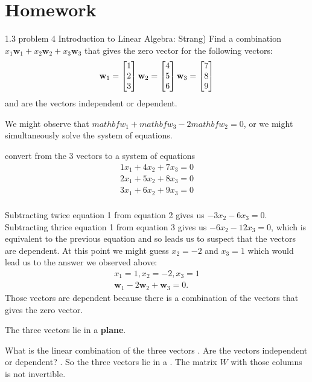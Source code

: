 \documentclass{ximera}
\begin{document}
\section*{Homework}
\begin{question}
1.3 problem 4 Introduction to Linear Algebra: Strang) Find a combination $x_1\mathbf{w}_1 + x_2\mathbf{w}_2 + x_3\mathbf{w}_3$ that gives the zero vector for the following vectors:
\begin{align*}
\mathbf{w}_1 = \begin{bmatrix}1\\2\\3\end{bmatrix} \mathbf{w}_2 = \begin{bmatrix}4\\5\\6\end{bmatrix} \mathbf{w}_3 = \begin{bmatrix}7\\8\\9\end{bmatrix}
\end{align*}
and are the vectors independent or dependent.
\begin{solution}
\begin{hint}
We might observe that $mathbf{w}_1 + mathbf{w}_3 -2mathbf{w}_2 = 0$, or we might simultaneously solve the system of equations.
\end{hint}
\begin{hint}
convert from the 3 vectors to a system of equations
\begin{align*}
1x_1+4x_2+7x_3=0\\
2x_1+5x_2+8x_3=0\\
3x_1+6x_2+9x_3=0\\
\end{align*}
\end{hint}
\begin{hint}
Subtracting twice equation 1 from equation 2 gives us $-3x_2 - 6x_3 = 0$. Subtracting thrice equation 1 from equation 3 gives us $-6x_2 - 12x_3 = 0$, which is equivalent to the previous equation and so leads us to suspect that the vectors are dependent. At this point we might guess $x_2 = -2$ and $x_3 = 1$ which would lead us to the answer we observed above:
\begin{align*}
x_1 =1, x_2 =-2, x_3 =1\\
\mathbf{w}_1-2\mathbf{w}_2+\mathbf{w}_3 =0.
\end{align*}
Those vectors are dependent because there is a combination of the vectors
that gives the zero vector.
\end{hint}
\begin{hint}
The three vectors lie in a \textbf{plane}.
\end{hint}
What is the linear combination of the three vectors .
Are the vectors independent or dependent?  .
So the three vectors lie in a . The matrix $W$ with those columns
is not invertible.
\end{solution}
\end{question}
\end{document}
